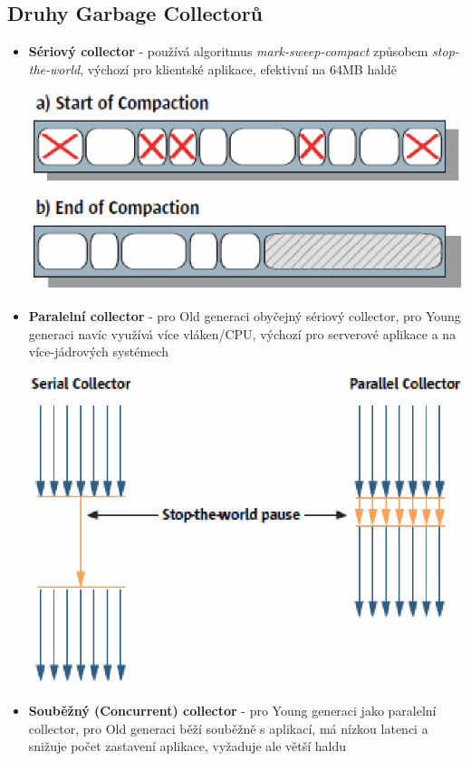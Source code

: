 \documentclass{scrreprt}
\begin{document}
\subsection{Druhy Garbage Collectorů}
\begin{itemize}
\item \textbf{Sériový collector} - používá algoritmus \emph{mark-sweep-compact} způsobem \emph{stop-the-world}, výchozí pro klientské aplikace, efektivní na 64MB haldě
\begin{center}
\includegraphics[scale=0.5]{img/gc_serial}
\end{center}
\item \textbf{Paralelní collector} - pro Old generaci obyčejný sériový collector, pro Young generaci navíc využívá více vláken/CPU, výchozí pro serverové aplikace a na více-jádrových systémech
\begin{center}
\includegraphics[scale=0.6]{img/gc_parallel}
\end{center}
\item \textbf{Souběžný (Concurrent) collector} - pro Young generaci jako paralelní collector, pro Old generaci běží souběžně s aplikací, má nízkou latenci a snižuje počet zastavení aplikace, vyžaduje ale větší haldu

\end{itemize}
\end{document}
